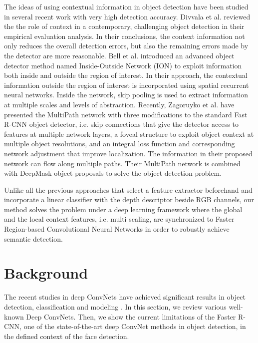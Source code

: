 \documentclass[10pt,journal,cspaper,compsoc]{IEEEtran}
\begin{document}
The ideas of using contextual information in object detection have been studied in several recent work with very high detection accuracy. 
Divvala et al. \cite{divvala2009empirical} reviewed the the role of context in a contemporary, challenging object detection in their empirical evaluation
analysis. In their conclusions, the context information not only reduces the overall detection errors, but also the remaining errors made by the detector are more reasonable. Bell et al. \cite{bell2015inside} introduced an advanced object detector method named Inside-Outside Network (ION) to exploit information both inside and outside the region of interest. In their approach, the contextual information outside the region of interest is incorporated using spatial recurrent neural networks. Inside the network, skip pooling is used to extract information at multiple scales and levels of abstraction. Recently, Zagoruyko et al. \cite{zagoruyko2016multipath} have presented 
the MultiPath network with three modifications to the standard Fast R-CNN object detector, i.e. skip connections that give the detector access to features at multiple network layers, a foveal structure to exploit object context at multiple object resolutions, and an integral loss function and corresponding network adjustment that improve localization. The information in their proposed network can flow along multiple paths. Their MultiPath network is combined with DeepMask object proposals to solve the object detection problem. 
  




Unlike all the previous approaches that select a feature extractor beforehand and incorporate a linear classifier with the depth descriptor beside RGB channels, our method solves the problem under a  deep learning framework where the global and the local context features, i.e. multi scaling, are synchronized to Faster Region-based Convolutional Neural Networks in order to robustly achieve semantic detection.



\section{Background}
\label{sec:background}

The recent studies in deep ConvNets have achieved significant results in object detection, classification and modeling \cite{krizhevsky2012imagenet}. In this section, we review various well-known Deep ConvNets. Then, we show the current limitations of the Faster R-CNN, one of the state-of-the-art deep ConvNet methods in object detection, in the defined context of the face detection.
\end{document}
